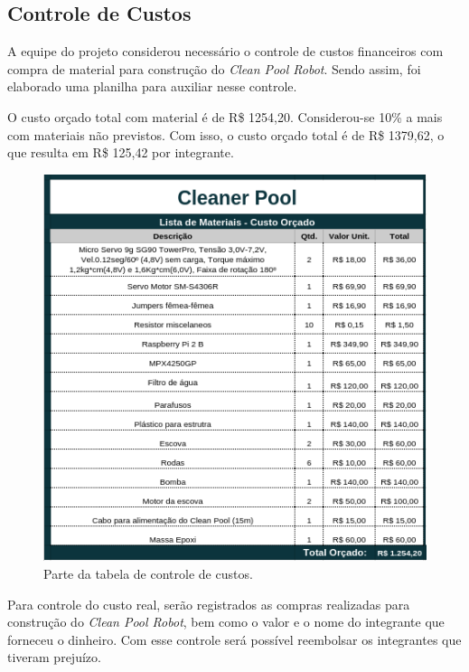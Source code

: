 \subsection{Controle de Custos}
A equipe do projeto considerou necessário o controle de custos financeiros com
compra de material para construção do \textit{Clean Pool Robot}. Sendo assim,
foi elaborado uma planilha para auxiliar nesse controle.
\par
O custo orçado total com material é de R\$ 1254,20. Considerou-se 10\% a mais
com materiais não previstos. Com isso, o custo orçado total é de R\$ 1379,62,
o que resulta em R\$ 125,42 por integrante.
\par
\begin{figure}[h]
    \centering
    \includegraphics[width=\textwidth]{figures/custos.png}
    \caption{Parte da tabela de controle de custos.}
    \label{fig:cost}
  \end{figure}
\FloatBarrier
\par
Para controle do custo real, serão registrados as compras realizadas para construção
do \textit{Clean Pool Robot}, bem como o valor e o nome do integrante que
forneceu o dinheiro. Com esse controle será possível reembolsar os integrantes
que tiveram prejuízo.  
